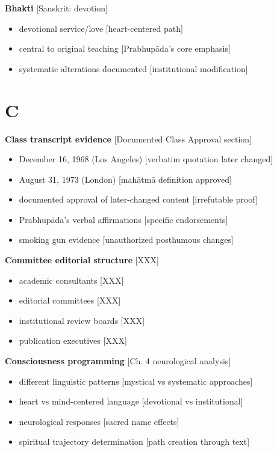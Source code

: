 \documentclass[11pt,twoside]{book}
\begin{document}
\textbf{\textbf{Bhakti}} {[}Sanskrit: devotion]
\begin{itemize}
\item devotional service/love [heart-centered path]
\item central to original teaching [Prabhupāda's core emphasis]
\item systematic alterations documented [institutional modification]
\end{itemize}
\section*{C}
\label{sec:orgc1bbb02}

\textbf{\textbf{Class transcript evidence}} {[}Documented Class Approval section]
\begin{itemize}
\item December 16, 1968 (Los Angeles) [verbatim quotation later changed]
\item August 31, 1973 (London) [mahātmā definition approved]
\item documented approval of later-changed content [irrefutable proof]
\item Prabhupāda's verbal affirmations [specific endorsements]
\item smoking gun evidence [unauthorized posthumous changes]
\end{itemize}

\textbf{\textbf{Committee editorial structure}} {[}XXX]
\begin{itemize}
\item academic consultants [XXX]
\item editorial committees [XXX]
\item institutional review boards [XXX]
\item publication executives [XXX]
\end{itemize}

\textbf{\textbf{Consciousness programming}} {[}Ch. 4 neurological analysis]
\begin{itemize}
\item different linguistic patterns [mystical vs systematic approaches]
\item heart vs mind-centered language [devotional vs institutional]
\item neurological responses [sacred name effects]
\item spiritual trajectory determination [path creation through text]
\end{itemize}
\end{document}
